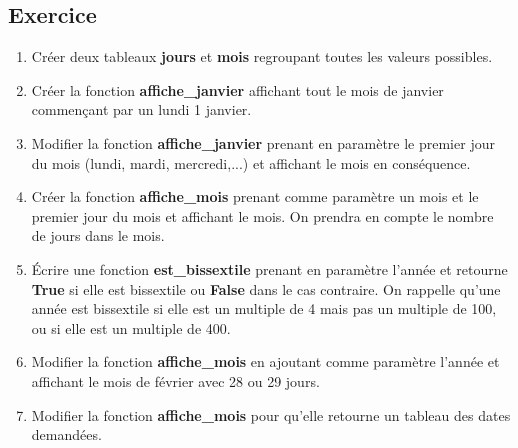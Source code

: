 \documentclass[11pt,a4paper]{article}
\newcounter{numexo}
\begin{document}
\subsection*{\Large Exercice \thenumexo }
\begin{enumerate}
\item Créer deux tableaux \textbf{jours} et \textbf{mois} regroupant toutes les valeurs possibles.
\item Créer la fonction \textbf{affiche\_janvier} affichant tout le mois de janvier commençant par un lundi 1 janvier.
\item Modifier la fonction \textbf{affiche\_janvier} prenant en paramètre le premier jour du mois (lundi, mardi, mercredi,...) et affichant le mois en conséquence.
\item Créer la fonction \textbf{affiche\_mois} prenant comme paramètre un mois et le premier jour du mois et affichant le mois. On prendra en compte le nombre de jours dans le mois.
\item Écrire une fonction \textbf{est\_bissextile} prenant en paramètre l'année et retourne \textbf{True} si elle est bissextile ou \textbf{False} dans le cas contraire. On rappelle qu'une année est bissextile si elle est un multiple de 4 mais pas un multiple de 100, ou si elle est un multiple de 400.
\item Modifier la fonction \textbf{affiche\_mois} en ajoutant comme paramètre l'année et affichant le mois de février avec 28 ou 29 jours.
\item Modifier la fonction \textbf{affiche\_mois} pour qu'elle retourne un tableau des dates demandées.
\end{enumerate}



\addtocounter{numexo}{1}
\end{document}
